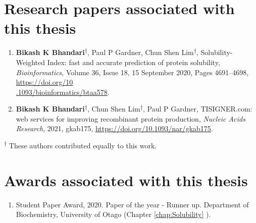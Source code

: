 \section*{Research papers associated with this thesis}
\begin{enumerate}
	\item \textbf{Bikash K Bhandari}\textsuperscript{$\dagger$}, Paul P Gardner, Chun Shen Lim\textsuperscript{$\dagger$}, Solubility-Weighted Index: fast and accurate prediction of protein solubility, \textit{Bioinformatics}, Volume 36, Issue 18, 15 September 2020, Pages 4691–4698, \href{https://doi.org/10.1093/bioinformatics/btaa578}{https://doi.org/10\\.1093/bioinformatics/btaa578}.
	
	
	\item \textbf{Bikash K Bhandari}\textsuperscript{$\dagger$}, Chun Shen Lim\textsuperscript{$\dagger$}, Paul P Gardner, TISIGNER.com: web services for improving recombinant protein production, \textit{Nucleic Acids Research}, 2021, gkab175, \href{https://doi.org/10.1093/nar/gkab175}{https://doi.org/10.1093/nar/gkab175}.
	
\end{enumerate}

\textsuperscript{$\dagger$} These authors contributed equally to this work.



\section*{Awards associated with this thesis}
\begin{enumerate}
	\item Student Paper Award, 2020. Paper of the year - Runner up. Department of Biochemistry, University of Otago (Chapter \ref{chap:Solubility}  \cite{Bhandari2020-pz}).

\end{enumerate}